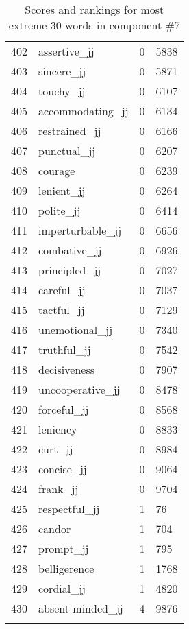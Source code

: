 \begin{longtable}[!htbp]{| rlr@{.}l |}
    402 & assertive\_jj & 0 & 5838 \\
    403 & sincere\_jj & 0 & 5871 \\
    404 & touchy\_jj & 0 & 6107 \\
    405 & accommodating\_jj & 0 & 6134 \\
    406 & restrained\_jj & 0 & 6166 \\
    407 & punctual\_jj & 0 & 6207 \\
    408 & courage & 0 & 6239 \\
    409 & lenient\_jj & 0 & 6264 \\
    410 & polite\_jj & 0 & 6414 \\
    411 & imperturbable\_jj & 0 & 6656 \\
    412 & combative\_jj & 0 & 6926 \\
    413 & principled\_jj & 0 & 7027 \\
    414 & careful\_jj & 0 & 7037 \\
    415 & tactful\_jj & 0 & 7129 \\
    416 & unemotional\_jj & 0 & 7340 \\
    417 & truthful\_jj & 0 & 7542 \\
    418 & decisiveness & 0 & 7907 \\
    419 & uncooperative\_jj & 0 & 8478 \\
    420 & forceful\_jj & 0 & 8568 \\
    421 & leniency & 0 & 8833 \\
    422 & curt\_jj & 0 & 8984 \\
    423 & concise\_jj & 0 & 9064 \\
    424 & frank\_jj & 0 & 9704 \\
    425 & respectful\_jj & 1 & 76 \\
    426 & candor & 1 & 704 \\
    427 & prompt\_jj & 1 & 795 \\
    428 & belligerence & 1 & 1768 \\
    429 & cordial\_jj & 1 & 4820 \\
    430 & absent-minded\_jj & 4 & 9876 \\
    \hline
    \caption{Scores and rankings for most extreme 30 words in component \#7} \\
\end{longtable}
